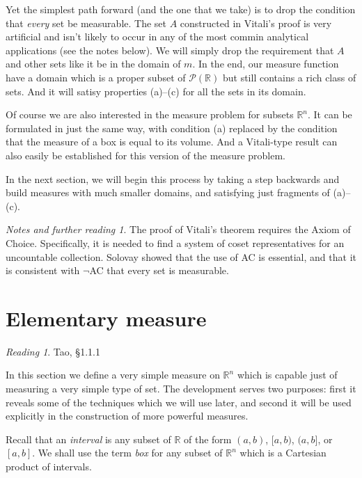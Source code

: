 \documentclass[11pt,oneside]{amsbook}
\newcommand{\RR}{{\mathbb R}}
\theoremstyle{definition}
\theoremstyle{plain}
\theoremstyle{definition}
\theoremstyle{remark}
\newtheorem*{notes}{Notes and further reading}
\newtheorem*{reading}{Reading}
\numberwithin{equation}{section}
\numberwithin{figure}{section}
\begin{document}
Yet the simplest path forward (and the one that we take) is to drop the condition that \emph{every} set be measurable. The set $A$ constructed in Vitali's proof is very artificial and isn't likely to occur in any of the most commin analytical applications (see the notes below). We will simply drop the requirement that $A$ and other sets like it be in the domain of $m$. In the end, our measure function have a domain which is a proper subset of $\mathcal P(\RR)$ but still contains a rich class of sets. And it will satisy properties (a)--(c) for all the sets in its domain.

Of course we are also interested in the measure problem for subsets $\RR^n$. It can be formulated in just the same way, with condition (a) replaced by the condition that the measure of a box is equal to its volume. And a Vitali-type result can also easily be established for this version of the measure problem.

In the next section, we will begin this process by taking a step backwards and build measures with much smaller domains, and satisfying just fragments of (a)--(c).

\begin{notes}
  The proof of Vitali's theorem requires the Axiom of Choice. Specifically, it is needed to find a system of coset representatives for an uncountable collection. Solovay showed that the use of AC is essential, and that it is consistent with $\neg$AC that every set is measurable.
\end{notes}

\section{Elementary measure}

\begin{reading}
  Tao, \S1.1.1
\end{reading}

In this section we define a very simple measure on $\RR^n$ which is capable just of measuring a very simple type of set. The development serves two purposes: first it reveals some of the techniques which we will use later, and second it will be used explicitly in the construction of more powerful measures.

Recall that an \emph{interval} is any subset of $\RR$ of the form $(a,b)$, $[a,b)$, $(a,b]$, or $[a,b]$. We shall use the term \emph{box} for any subset of $\RR^n$ which is a Cartesian product of intervals.
\end{document}
